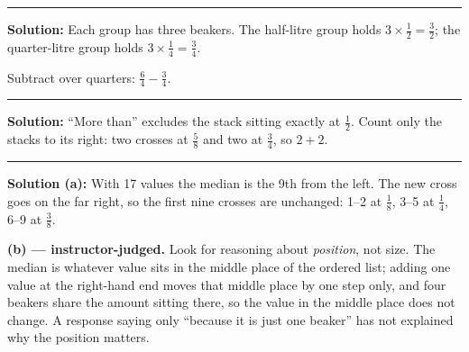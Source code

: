 \documentclass[12pt]{article}
\begin{document}
\vspace{0.15cm}\noindent\rule{\linewidth}{0.2pt}\vspace{0.15cm}


\textbf{Solution:} Each group has three beakers. The half-litre group holds $3 \times \frac{1}{2} = \frac{3}{2}$; the quarter-litre group holds $3 \times \frac{1}{4} = \frac{3}{4}$.

Subtract over quarters: $\frac{6}{4} - \frac{3}{4}$. 

\vspace{0.15cm}\noindent\rule{\linewidth}{0.2pt}\vspace{0.15cm}


\textbf{Solution:} ``More than'' excludes the stack sitting exactly at $\frac{1}{2}$. Count only the stacks to its right: two crosses at $\frac{5}{8}$ and two at $\frac{3}{4}$, so $2 + 2$. 

\vspace{0.15cm}\noindent\rule{\linewidth}{0.2pt}\vspace{0.15cm}


\textbf{Solution (a):} With 17 values the median is the 9th from the left. The new cross goes on the far right, so the first nine crosses are unchanged: 1--2 at $\frac{1}{8}$, 3--5 at $\frac{1}{4}$, 6--9 at $\frac{3}{8}$. 

\textbf{(b) --- instructor-judged.} Look for reasoning about \emph{position}, not size. The median is whatever value sits in the middle place of the ordered list; adding one value at the right-hand end moves that middle place by one step only, and four beakers share the amount sitting there, so the value in the middle place does not change. A response saying only ``because it is just one beaker'' has not explained why the position matters.
\end{document}
